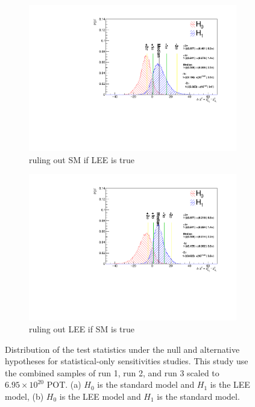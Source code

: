 \begin{figure}[ht] 
\begin{center}
    \begin{subfigure}[b]{0.48\textwidth}
        \centering
        \includegraphics[width=1.\textwidth]{Sensitivity/sensitivity-run123/SBNfit_Cls_nue_1e0p_reco_e_H1_mc_collab_statsonlyCNP_Chi.pdf}
        \caption{ruling out SM if LEE is true}
    \end{subfigure}
        \begin{subfigure}[b]{0.48\textwidth}
        \centering
        \includegraphics[width=1.\textwidth]{Sensitivity/sensitivity-run123/SBNfit_Cls_nue_1e0p_reco_e_H1_mc_collab_statsonly_exclusionCNP_Chi.pdf}
        \caption{ruling out LEE if SM is true}
    \end{subfigure}
\caption{Distribution of the test statistics under the null and alternative hypotheses for statistical-only sensitivities studies. This study use the combined samples of run 1, run 2, and run 3 scaled to $6.95\times10^{20}$ POT. (a) $H_0$ is the standard model and $H_1$ is the LEE model, (b) $H_0$ is the LEE model and $H_1$ is the standard model.}
\label{fig:1eNp:SBNFit:statonlysensitivity}
\end{center}
\end{figure}

